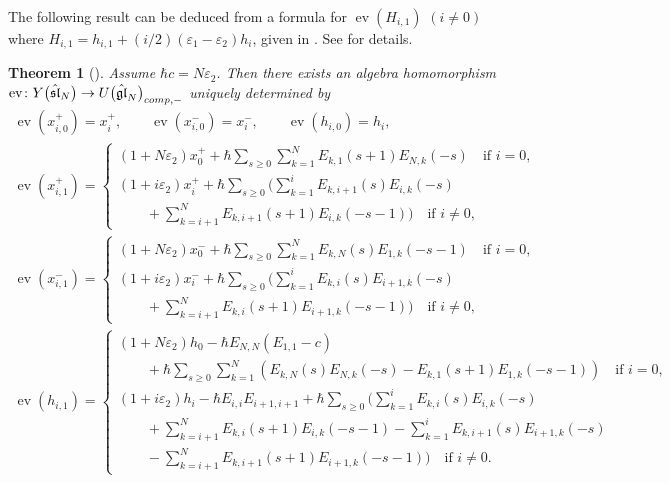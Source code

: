 \documentclass[11pt]{article}
\newtheorem{thm}{Theorem}[section]
\theoremstyle{definition}
\numberwithin{equation}{section}
\DeclareMathOperator{\ev}{ev}
\newcommand{\ve}{\varepsilon}
\newcommand{\affY}{Y\big(\affsl\big)}
\newcommand{\gl}{\mathfrak{gl}}
\newcommand{\affsl}{\hat{\mathfrak{sl}}_N}
\begin{document}
The following result can be deduced from a formula for $\ev(H_{i,1})$ $(i \neq 0)$ where $H_{i,1}=h_{i,1} + (i/2)(\ve_1-\ve_2)h_i$, given in \cite[Section~6, pp.~462--463]{MR2323534}. See \cite{kodera_evaluation} for details.
\begin{thm}[\cite{MR2323534, kodera_evaluation}]Assume $\hbar c = N \ve_2$. Then there exists an algebra homomorphism $\ev \colon \affY \to U\big(\hat{\gl}_N\big)_{{\rm comp},-}$ uniquely determined by
\begin{gather*}
\ev(x_{i,0}^{+}) = x_{i}^{+}, \qquad \ev(x_{i,0}^{-}) = x_{i}^{-},\qquad \ev(h_{i,0}) = h_{i},\\
\ev(x_{i,1}^{+}) = \begin{cases}
(1+ N \varepsilon_2) x_{0}^{+} + \hbar \displaystyle\sum_{s \geq 0} \sum_{k=1}^N E_{k,1}(s+1) E_{N,k}(-s) \quad \text{if $i = 0$},\\
(1+ i \varepsilon_2) x_{i}^{+} + \hbar \displaystyle\sum_{s \geq 0} \bigg( \sum_{k=1}^i E_{k,i+1}(s) E_{i,k}(-s)\\
\qquad{} + \displaystyle \sum_{k=i+1}^N E_{k,i+1}(s+1) E_{i,k}(-s-1) \bigg) \quad \text{if $i \neq 0$},
\end{cases}\\
\ev(x_{i,1}^-) = \begin{cases}
(1+ N \varepsilon_2) x_{0}^{-} + \hbar \displaystyle\sum_{s \geq 0} \sum_{k=1}^N E_{k,N}(s) E_{1,k}(-s-1)\quad \text{if $i = 0$},\\
(1+ i \varepsilon_2) x_{i}^{-} + \hbar \displaystyle\sum_{s \geq 0} \bigg( \sum_{k=1}^i E_{k,i}(s) E_{i+1,k}(-s) \\
\qquad {} + \displaystyle\sum_{k=i+1}^N E_{k,i}(s+1) E_{i+1,k}(-s-1) \bigg) \quad \text{if $i \neq 0$},
\end{cases}\\
\ev(h_{i,1}) = \begin{cases}
(1+ N \varepsilon_2) h_{0} - \hbar E_{N,N} (E_{1,1}-c) \\
\qquad {}+ \hbar \displaystyle\sum_{s \geq 0} \sum_{k=1}^{N} ( E_{k,N}(s) E_{N,k}(-s) - E_{k,1}(s+1) E_{1,k}(-s-1) ) \quad \text{if $i = 0$},\\
(1+ i \varepsilon_2) h_{i} - \hbar E_{i,i}E_{i+1,i+1}+ \hbar \displaystyle\sum_{s \geq 0} \bigg( \sum_{k=1}^{i} E_{k,i}(s) E_{i,k}(-s) \\
\qquad{}+ \displaystyle\sum_{k=i+1}^{N} E_{k,i}(s+1) E_{i,k}(-s-1) - \displaystyle\sum_{k=1}^{i}E_{k,i+1}(s) E_{i+1,k}(-s) \\
\qquad {} - \displaystyle\sum_{k=i+1}^{N} E_{k,i+1}(s+1) E_{i+1,k}(-s-1) \bigg)\quad \text{if $i \neq 0$}.
\end{cases}
\end{gather*}
\end{thm}
\end{document}
